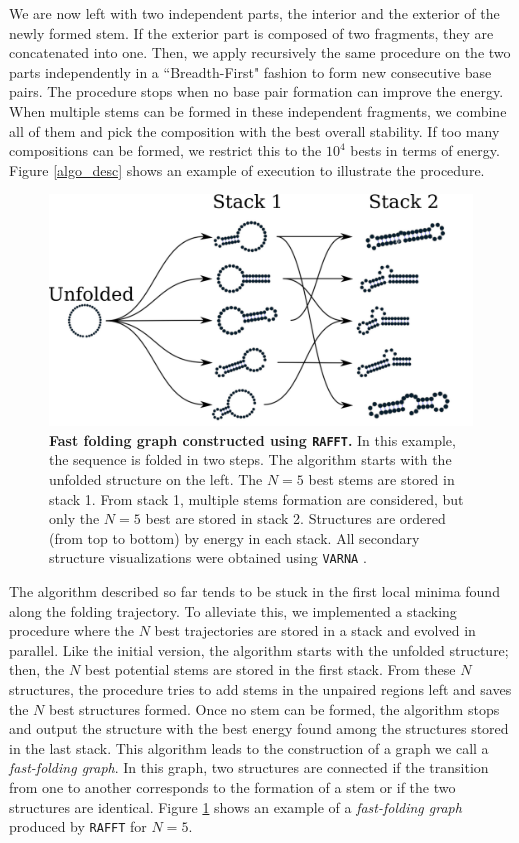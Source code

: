 We are now left with two independent parts, the interior and the exterior of the newly formed stem. If the exterior part is composed of two fragments, they are concatenated into one. Then, we apply recursively the same procedure on the two parts independently in a ``Breadth-First" fashion to form new consecutive base pairs. The procedure stops when no base pair formation can improve the energy. When multiple stems can be formed in these independent fragments, we combine all of them and pick the composition with the best overall stability. If too many compositions can be formed, we restrict this to the $10^4$ bests in terms of energy. Figure \ref{algo_desc} shows an example of execution to illustrate the procedure. 
\begin{figure}[t!]
	\centering
	\includegraphics[width=1\linewidth]{../res/images/rafft/fast_paths_graph.png}
	\caption{\label{fast_path_graph}\textbf{Fast folding graph constructed using \texttt{RAFFT}.} In this example, the sequence is folded in two steps. The algorithm starts with the unfolded structure on the left. The \(N=5\) best stems are stored in stack 1. From stack 1, multiple stems formation are considered, but only the \(N=5\) best are stored in stack 2. Structures are ordered (from top to bottom) by energy in each stack. All secondary structure visualizations were obtained using \texttt{VARNA} \cite{darty09_varna}.}
\end{figure}

The algorithm described so far tends to be stuck in the first local minima found along the folding trajectory. To alleviate this, we implemented a stacking procedure where the \(N\) best trajectories are stored in a stack and evolved in parallel. Like the initial version, the algorithm starts with the unfolded structure; then, the \(N\) best potential stems are stored in the first stack. From these \(N\) structures, the procedure tries to add stems in the unpaired regions left and saves the \(N\) best structures formed. Once no stem can be formed, the algorithm stops and output the structure with the best energy found among the structures stored in the last stack. This algorithm leads to the construction of a graph we call a \emph{fast-folding graph}. In this graph, two structures are connected if the transition from one to another corresponds to the formation of a stem or if the two structures are identical. Figure \ref{fast_path_graph} shows an example of a \emph{fast-folding graph} produced by \texttt{RAFFT} for $N=5$.

